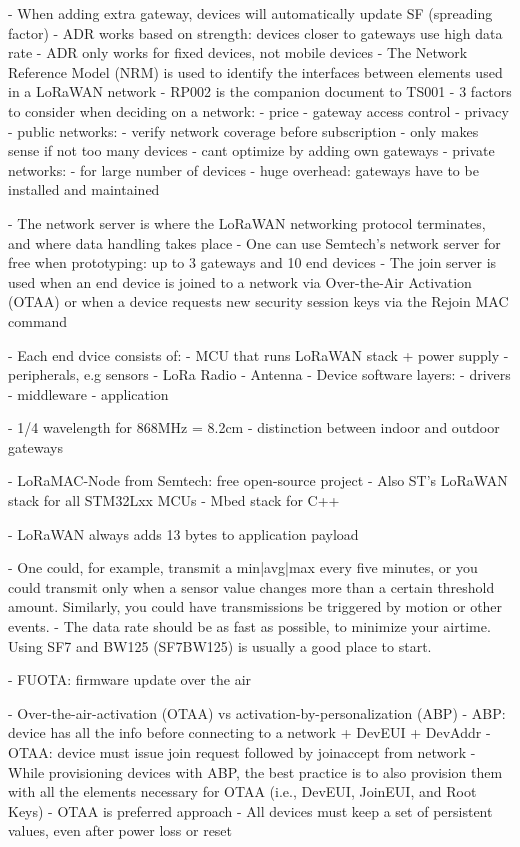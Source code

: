 - When adding extra gateway, devices will automatically update SF (spreading factor)
- ADR works based on strength: devices closer to gateways use high data rate
- ADR only works for fixed devices, not mobile devices
- The Network Reference Model (NRM) is used to identify the interfaces between elements used in a LoRaWAN network
- RP002 is the companion document to TS001
- 3 factors to consider when deciding on a network:
    - price 
    - gateway access control 
    - privacy
- public networks:
    - verify network coverage before subscription
    - only makes sense if not too many devices
    - cant optimize by adding own gateways
- private networks:
    - for large number of devices 
    - huge overhead: gateways have to be installed and maintained

- The network server is where the LoRaWAN networking protocol terminates, and where data handling takes place
- One can use Semtech's network server for free when prototyping: up to 3 gateways and 10 end devices 
- The join server is used when an end device is joined to a network via Over-the-Air Activation (OTAA) or when a device requests 
  new security session keys via the Rejoin MAC command

- Each end dvice consists of:
    - MCU that runs LoRaWAN stack + power supply
    - peripherals, e.g sensors
    - LoRa Radio
    - Antenna
- Device software layers:
    - drivers
    - middleware
    - application 

- 1/4 wavelength for 868MHz = 8.2cm
- distinction between indoor and outdoor gateways

- LoRaMAC-Node from Semtech: free open-source project
- Also ST's LoRaWAN stack for all STM32Lxx MCUs
- Mbed stack for C++

- LoRaWAN always adds 13 bytes to application payload

- One could, for example, transmit a min|avg|max every five minutes, or you could transmit only when a sensor value changes more than a certain threshold amount. 
  Similarly, you could have transmissions be triggered by motion or other events.
- The data rate should be as fast as possible, to minimize your airtime. 
  Using SF7 and BW125 (SF7BW125) is usually a good place to start.

- FUOTA: firmware update over the air

- Over-the-air-activation (OTAA) vs activation-by-personalization (ABP)
- ABP: device has all the info before connecting to a network + DevEUI + DevAddr
- OTAA: device must issue join request followed by joinaccept from network
- While provisioning devices with ABP, the best practice is to also provision 
  them with all the elements necessary for OTAA (i.e., DevEUI, JoinEUI, and Root Keys)
- OTAA is preferred approach
- All devices must keep a set of persistent values, even after power loss or reset

